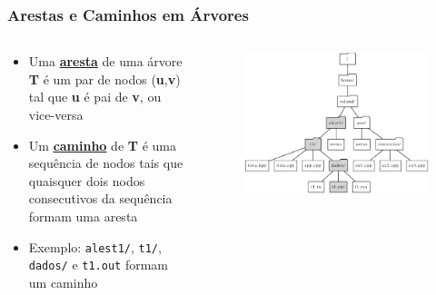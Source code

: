 \documentclass[aspectratio=169]{beamer}
\begin{document}
\begin{frame}\frametitle{Arestas e Caminhos em Árvores}
\begin{columns}[T]
\begin{column}{0.4\linewidth}
\begin{itemize}
	\item Uma \textbf{\underline{aresta}} de uma árvore \textbf{T} é um par de nodos (\textbf{u},\textbf{v}) tal que \textbf{u} é pai de \textbf{v}, ou vice-versa
	\item Um \textbf{\underline{caminho}} de \textbf{T} é uma sequência de nodos tais que quaisquer dois nodos consecutivos
da sequência formam uma aresta
	\item Exemplo: \texttt{alest1/}, \texttt{t1/}, \texttt{dados/} e \texttt{t1.out} formam um caminho
\end{itemize}
\end{column}
\begin{column}{0.6\linewidth}
\vspace{-5mm}
\begin{figure}[h]
	\centering
	\includegraphics[height=0.7\paperheight]{imagens/arvore4-v2.eps}
\end{figure}
\end{column}
\end{columns}
\end{frame}
\end{document}
